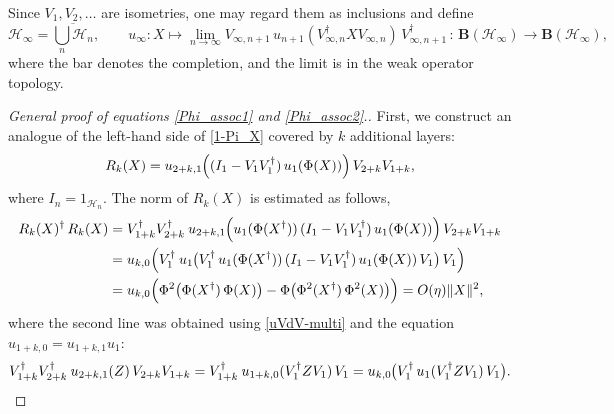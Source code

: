 \documentclass[12pt]{article}
\newcommand{\calH}{\mathcal{H}}
\newcommand{\ts}{\mkern1mu}
\newcommand{\Bo}{\mathbf{B}}
\newtheorem[definition]{Definition}[Theorem]{Definition}
\newtheorem[remark]{Example}[Theorem]{Example}
\newtheorem[remark]{Remark}[Theorem]{Remark}
\newtheorem[remark]{Question}[Theorem]{Open question}
\newtheorem*[definition]{definition}{Definition}
\newtheorem*[remark]{example}{Example}
\newtheorem*[remark]{remark}{Remark}
\newtheorem*[remark]{question}{Open question}
\numberwithin{equation}{section}
\begin{document}
\begin{Remark}
Since $V_1,V_2,\ldots$ are isometries, one may regard them as inclusions and define
\begin{equation}
\calH_\infty=\overline{\bigcup_{n}\calH_n},\qquad
u_\infty\colon X\mapsto\lim_{n\to\infty}
V_{\infty,n+1}\,u_{n+1}(V_{\infty,n}^\dag XV_{\infty,n})\,V_{\infty,n+1}^\dag\,
\colon\, \Bo(\calH_\infty)\to\Bo(\calH_\infty),
\end{equation}
where the bar denotes the completion, and the limit is in the weak operator topology.
\end{Remark}

\begin{proof}[General proof of equations \eqref{Phi_assoc1} and \eqref{Phi_assoc2}.]
First, we construct an analogue of the left-hand side of \eqref{1-Pi_X} covered by $k$ additional layers:
\begin{equation}
R_k(X)=u_{2+k,1}\mkern-1mu\Bigl(
(I_1-V_1V_1^\dag)\,u_1(\Phi(X))
\Bigr)\,V_{2+k}V_{1+k},
\end{equation}
where $I_n=1_{\calH_n}$. The norm of $R_k(X)$ is estimated as follows,
\[
\begin{aligned}
R_k(X)^\dag\,R_k(X)
&= V_{1+k}^\dag V_{2+k}^\dag\,\ts u_{2+k,1}\mkern-1mu\Bigl(
u_1(\Phi(X^\dag))\,(I_1-V_1V_1^\dag)\,u_1(\Phi(X))
\Bigr)\, V_{2+k}V_{1+k}
\\
&= u_{k,0}\Bigl(V_1^\dag\,\ts u_1\mkern-1mu\bigl(
V_1^\dag\,u_1(\Phi(X^\dag))\,(I_1-V_1V_1^\dag)\,u_1(\Phi(X))\,V_1
\bigr)\, V_1\Bigr)\\
&= u_{k,0}\Bigl(\Phi^2\bigl(\Phi(X^\dag)\,\Phi(X)\bigr)
-\Phi\bigl(\Phi^2(X^\dag)\,\Phi^2(X)\bigr)\Bigr)
=O(\eta)\|X\|^2,
\end{aligned}
\]
where the second line was obtained using \eqref{uVdV-multi} and the equation $u_{1+k,0}=u_{1+k,1}u_1$:
\[
V_{1+k}^\dag V_{2+k}^\dag\,\ts u_{2+k,1}(Z)\, V_{2+k}V_{1+k}
=V_{1+k}^\dag\,\ts u_{1+k,0}(V_1^\dag ZV_1)\,V_1
= u_{k,0}\mkern-1mu\bigl(V_1^\dag\,u_1(V_1^\dag ZV_1)\,V_1\bigr).
\]


\end{proof}
\end{document}
